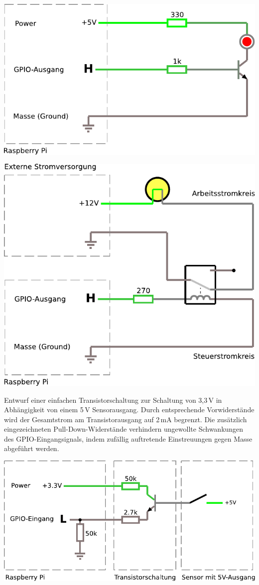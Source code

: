 \begin{center}
    \includegraphics[width=.8\linewidth]{02-hardwaredesign/img/led_transistor_circuitjs}
    \bigskip

    \includegraphics[width=.8\linewidth]{02-hardwaredesign/img/led_relais_circuitjs}
\end{center}

\bigskip
\teilaufgabe
Entwurf einer einfachen Transistorschaltung zur Schaltung von 3,3\,V in
Abhängigkeit von einem 5\,V Sensorausgang. Durch entsprechende Vorwiderstände
wird der Gesamtstrom am Transistorausgang auf 2\,mA begrenzt. Die zusätzlich
eingezeichneten Pull-Down-Widerstände verhindern ungewollte Schwankungen des
GPIO-Eingangsignals, indem zufällig auftretende Einstreuungen gegen Masse
abgeführt werden.

\includegraphics[width=\textwidth]{02-hardwaredesign/img/logiklevel_transistor_aufgabe}



